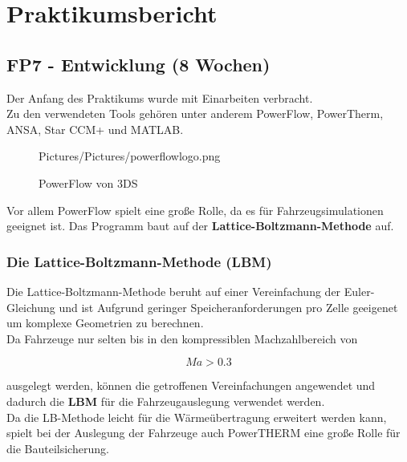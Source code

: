 \chapter{Praktikumsbericht}
\label{Bericht}

\section{FP7 - Entwicklung (8 Wochen)}
\label{FP7}

Der Anfang des Praktikums wurde mit Einarbeiten verbracht.\\
Zu den verwendeten Tools gehören unter anderem PowerFlow, PowerTherm, ANSA, Star CCM+ und MATLAB.\\

\begin{figure}[H]
	\begin{center}
		\begin{overpic}[width=\linewidth]{Pictures/Pictures/powerflowlogo.png}
			
		\end{overpic}
		\caption{PowerFlow von 3DS}
		\label{fig:powerflow}	
	\end{center}
\end{figure}


Vor allem PowerFlow spielt eine große Rolle, da es für Fahrzeugsimulationen geeignet ist. Das Programm baut auf der \textbf{Lattice-Boltzmann-Methode} auf.\\

\subsection{Die Lattice-Boltzmann-Methode (LBM)}
\label{LBM}
Die Lattice-Boltzmann-Methode beruht auf einer Vereinfachung der Euler-Gleichung und ist Aufgrund geringer Speicheranforderungen pro Zelle geeigenet um komplexe Geometrien zu berechnen. \\
Da Fahrzeuge nur selten bis in den kompressiblen Machzahlbereich von 

\begin{equation}
		\label{MachEq}
	Ma > 0.3
\end{equation}

ausgelegt werden, können die getroffenen Vereinfachungen angewendet und dadurch die \textbf{LBM} für die Fahrzeugauslegung verwendet werden. \\
Da die LB-Methode leicht für die Wärmeübertragung erweitert werden kann, spielt bei der Auslegung der Fahrzeuge auch PowerTHERM eine große Rolle für die Bauteilsicherung.

